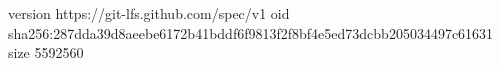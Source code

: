 version https://git-lfs.github.com/spec/v1
oid sha256:287dda39d8aeebe6172b41bddf6f9813f2f8bf4e5ed73dcbb205034497c61631
size 5592560
